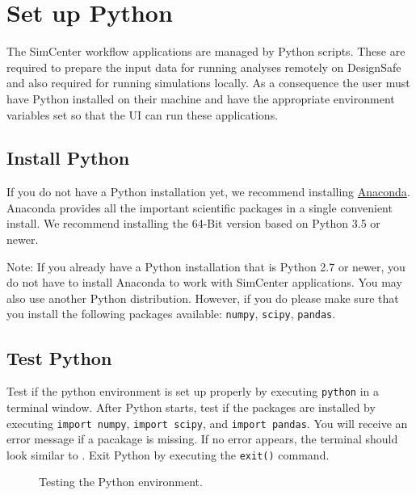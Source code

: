\section{Set up Python}

The SimCenter workflow applications are managed by Python
scripts. These are required to prepare the input data for running
analyses remotely on DesignSafe and also required for running
simulations locally. As a consequence the user must have Python
installed on their machine and have the appropriate environment
variables set so that the UI can run these applications.

\subsection{Install Python}

If you do not have a Python installation yet, we recommend
installing \href{http://www.anaconda.com/distribution/#download-section}{Anaconda}. Anaconda
provides all the important scientific packages in a single convenient
install. We recommend installing the 64-Bit version based on Python
3.5 or newer.

Note: If you already have a Python installation that is Python 2.7 or
newer, you do not have to install Anaconda to work with SimCenter
applications. You may also use another Python distribution. However,
if you do please make sure that you install the following packages
available: \texttt{numpy}, \texttt{scipy}, \texttt{pandas}.

\subsection{Test Python}

Test if the python environment is set up properly by
executing \texttt{python} in a terminal window. After Python starts,
test if the packages are installed by executing \texttt{import
numpy}, \texttt{import scipy}, and \texttt{import pandas}. You will
receive an error message if a pacakage is missing. If no error
appears, the terminal should look similar
to . Exit Python by executing
the \texttt{exit()} command.

\begin{figure}[!htbp]
  \caption{Testing the Python environment.}
  \label{fig:python_test}
\end{figure}

